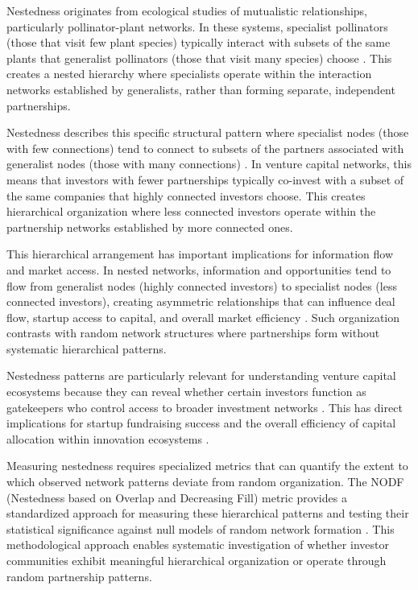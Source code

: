 Nestedness originates from ecological studies of mutualistic relationships, particularly pollinator-plant networks. In these systems, specialist pollinators (those that visit few plant species) typically interact with subsets of the same plants that generalist pollinators (those that visit many species) choose \cite{Mariani2019}. This creates a nested hierarchy where specialists operate within the interaction networks established by generalists, rather than forming separate, independent partnerships.

Nestedness describes this specific structural pattern where specialist nodes (those with few connections) tend to connect to subsets of the partners associated with generalist nodes (those with many connections) \cite{Mariani2019}. In venture capital networks, this means that investors with fewer partnerships typically co-invest with a subset of the same companies that highly connected investors choose. This creates hierarchical organization where less connected investors operate within the partnership networks established by more connected ones.

This hierarchical arrangement has important implications for information flow and market access. In nested networks, information and opportunities tend to flow from generalist nodes (highly connected investors) to specialist nodes (less connected investors), creating asymmetric relationships that can influence deal flow, startup access to capital, and overall market efficiency \cite{Mariani2019}. Such organization contrasts with random network structures where partnerships form without systematic hierarchical patterns.

Nestedness patterns are particularly relevant for understanding venture capital ecosystems because they can reveal whether certain investors function as gatekeepers who control access to broader investment networks \cite{Borgatti2011}. This has direct implications for startup fundraising success and the overall efficiency of capital allocation within innovation ecosystems \cite{Theophile2024}.

Measuring nestedness requires specialized metrics that can quantify the extent to which observed network patterns deviate from random organization. The NODF (Nestedness based on Overlap and Decreasing Fill) metric provides a standardized approach for measuring these hierarchical patterns and testing their statistical significance against null models of random network formation \cite{Mariani2019}. This methodological approach enables systematic investigation of whether investor communities exhibit meaningful hierarchical organization or operate through random partnership patterns.

